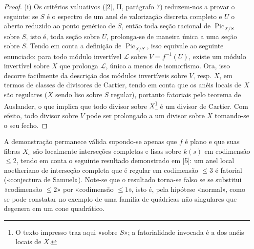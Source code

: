 \begin{proof}
(i) Os critérios valuativos ([2], II, parágrafo 7) reduzem-nos a provar o
seguinte: se $S$ é o espectro de um anel de valorização discreta completo e $U$
o aberto reduzido ao ponto genérico de $S$, então toda seção racional de
$\operatorname{Pic}_{X/S}$ sobre $S$, isto é, toda seção sobre $U$, prolonga-se
de maneira única a uma seção sobre $S$. Tendo em conta a definição de
$\operatorname{Pic}_{X/S}$, isso equivale ao seguinte enunciado: para todo
módulo invertível $\mathcal L$ sobre $V=f^{-1}(U)$, existe um módulo invertível
sobre $X$ que prolonga $\mathcal L$, único a menos de isomorfismo. Ora, isso
decorre facilmente da descrição dos módulos invertíveis sobre $V$, resp. $X$,
em termos de classes de divisores de Cartier, tendo em conta que os anéis
locais de $X$ são regulares ($X$ sendo liso sobre $S$ regular), portanto
fatoriais pelo teorema de Auslander, o que implica que todo divisor sobre
$X$\footnote{O texto impresso traz aqui «sobre $S$»; a fatorialidade invocada é
a dos anéis locais de $X$.} é um divisor de Cartier. Com efeito, todo divisor
sobre $V$ pode ser prolongado a um divisor sobre $X$ tomando-se o seu fecho.
\end{proof}

 A demonstração permanece válida supondo-se apenas que
$f$ é plano e que suas fibras $X_s$ são localmente interseções completas e
lisas sobre $k(s)$ em codimensão $\leq2$, tendo em conta o seguinte resultado
demonstrado em [5]: um anel local noetheriano de interseção completa que é
regular em codimensão $\leq3$ é fatorial («conjectura de Samuel»). Note-se que o
resultado torna-se falso se se substitui «codimensão $\leq2$» por «codimensão
$\leq1$», isto é, pela hipótese «normal», como se pode constatar no exemplo de
uma família de quádricas não singulares que degenera em um cone quadrático.

